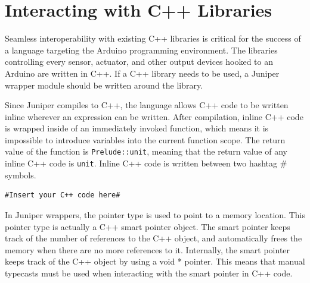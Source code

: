 \documentclass{sigplanconf}
\begin{document}
\section{Interacting with C++ Libraries}
Seamless interoperability with existing C++ libraries is critical for the success of a language targeting the Arduino programming environment. The libraries controlling every sensor, actuator, and other output devices hooked to an Arduino are written in C++. If a C++ library needs to be used, a Juniper wrapper module should be written around the library.

Since Juniper compiles to C++, the language allows C++ code to be written inline wherever an expression can be written. After compilation, inline C++ code is wrapped inside of an immediately invoked function, which means it is impossible to introduce variables into the current function scope. The return value of the function is \texttt{Prelude::unit}, meaning that the return value of any inline C++ code is \texttt{unit}. Inline C++ code is written between two hashtag \# symbols.
\begin{verbatim}
#Insert your C++ code here#
\end{verbatim}

In Juniper wrappers, the pointer type is used to point to a memory location. This pointer type is actually a C++ smart pointer object. The smart pointer keeps track of the number of references to the C++ object, and automatically frees the memory when there are no more references to it. Internally, the smart pointer keeps track of the C++ object by using a void * pointer. This means that manual typecasts must be used when interacting with the smart pointer in C++ code.
\end{document}
